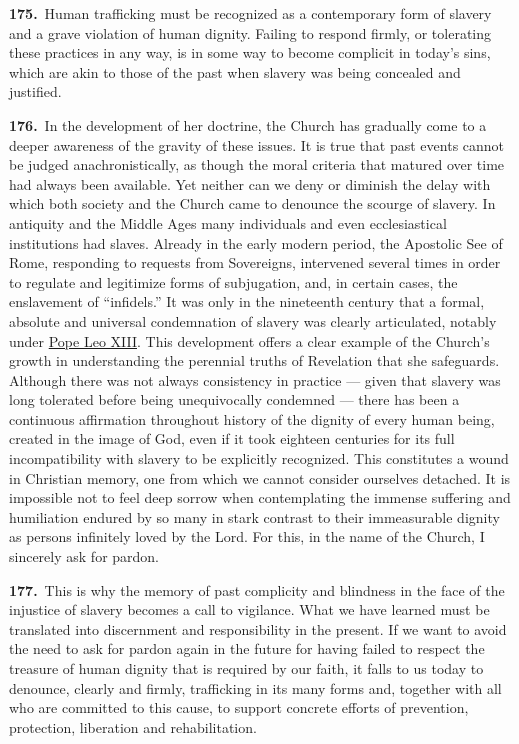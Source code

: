 \documentclass{article}
\begin{document}
\textbf{175.}\ Human trafficking must be recognized as a contemporary form of slavery and a grave violation of human dignity. Failing to respond firmly, or tolerating these practices in any way, is in some way to become complicit in today's sins, which are akin to those of the past when slavery was being concealed and justified.\cite{n173}

\textbf{176.}\ In the development of her doctrine, the Church has gradually come to a deeper awareness of the gravity of these issues. It is true that past events cannot be judged anachronistically, as though the moral criteria that matured over time had always been available. Yet neither can we deny or diminish the delay with which both society and the Church came to denounce the scourge of slavery. In antiquity and the Middle Ages many individuals and even ecclesiastical institutions had slaves. Already in the early modern period, the Apostolic See of Rome, responding to requests from Sovereigns, intervened several times in order to regulate and legitimize forms of subjugation, and, in certain cases, the enslavement of ``infidels.''\cite{n174} It was only in the nineteenth century that a formal, absolute and universal condemnation of slavery was clearly articulated, notably under \href{https://www.vatican.va/content/leo-xiii/en.html}{Pope Leo XIII}.\cite{n175} This development offers a clear example of the Church's growth in understanding the perennial truths of Revelation that she safeguards. Although there was not always consistency in practice --- given that slavery was long tolerated before being unequivocally condemned --- there has been a continuous affirmation throughout history of the dignity of every human being, created in the image of God, even if it took eighteen centuries for its full incompatibility with slavery to be explicitly recognized. This constitutes a wound in Christian memory, one from which we cannot consider ourselves detached.\cite{n176} It is impossible not to feel deep sorrow when contemplating the immense suffering and humiliation endured by so many in stark contrast to their immeasurable dignity as persons infinitely loved by the Lord. For this, in the name of the Church, I sincerely ask for pardon.

\textbf{177.}\ This is why the memory of past complicity and blindness in the face of the injustice of slavery becomes a call to vigilance. What we have learned must be translated into discernment and responsibility in the present. If we want to avoid the need to ask for pardon again in the future for having failed to respect the treasure of human dignity that is required by our faith, it falls to us today to denounce, clearly and firmly, trafficking in its many forms and, together with all who are committed to this cause, to support concrete efforts of prevention, protection, liberation and rehabilitation.
\end{document}
